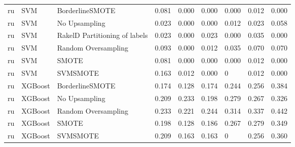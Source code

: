 \begin{tabular}{lllllllll}
      ru &                             SVM &               BorderlineSMOTE & 0.081 &                     0.000 &                 0.000 &                  0.000 &                                   0.012 &     0.000 \\
      ru &                             SVM &                 No Upsampling & 0.023 &                     0.000 &                 0.000 &                  0.012 &                                   0.023 &     0.058 \\
      ru &                             SVM & RakelD Partitioning of labels & 0.023 &                     0.000 &                 0.023 &                  0.000 &                                   0.035 &     0.000 \\
      ru &                             SVM &           Random Oversampling & 0.093 &                     0.000 &                 0.012 &                  0.035 &                                   0.070 &     0.070 \\
      ru &                             SVM &                         SMOTE & 0.081 &                     0.000 &                 0.000 &                  0.000 &                                   0.012 &     0.000 \\
      ru &                             SVM &                      SVMSMOTE & 0.163 &                     0.012 &                 0.000 &                      0 &                                   0.012 &     0.000 \\
      ru &                         XGBoost &               BorderlineSMOTE & 0.174 &                     0.128 &                 0.174 &                  0.244 &                                   0.256 &     0.384 \\
      ru &                         XGBoost &                 No Upsampling & 0.209 &                     0.233 &                 0.198 &                  0.279 &                                   0.267 &     0.326 \\
      ru &                         XGBoost &           Random Oversampling & 0.233 &                     0.221 &                 0.244 &                  0.314 &                                   0.337 &     0.442 \\
      ru &                         XGBoost &                         SMOTE & 0.198 &                     0.128 &                 0.186 &                  0.267 &                                   0.279 &     0.349 \\
      ru &                         XGBoost &                      SVMSMOTE & 0.209 &                     0.163 &                 0.163 &                      0 &                                   0.256 &     0.360 \\
\bottomrule
\end{tabular}
